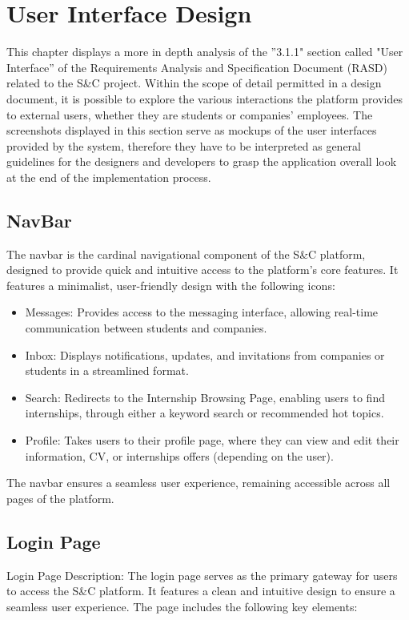 \chapter{User Interface Design}
This chapter displays a more in depth analysis of the ”3.1.1" section called "User Interface” of the
 Requirements Analysis and
 Specification Document (RASD) related to the S\&C project. 
 Within the scope of detail permitted in a design document, 
 it is possible to explore the various interactions the platform provides to external users,
  whether they are students or companies' employees.
 The screenshots displayed in this section serve as mockups of the user interfaces provided by the system, 
 therefore they have to be interpreted as general guidelines for the designers and developers to
 grasp the application overall look at the end of the implementation process.



\section{NavBar}
The navbar is the cardinal navigational component of the S\&C platform, 
designed to provide quick and intuitive access to the platform's core features. 
It features a minimalist, user-friendly design with the following icons:  

\begin{itemize}
    \item Messages: Provides access to the messaging interface, 
    allowing real-time communication between students and companies.  
    \item Inbox: Displays notifications, updates, 
    and invitations from companies or students in a streamlined format.  
    \item Search: Redirects to the Internship Browsing Page,
    enabling users to find internships, through either a keyword search or recommended hot topics.
    \item Profile: Takes users to their profile page, 
    where they can view and edit their information, CV, or internships offers (depending on the user).  
\end{itemize}
The navbar ensures a seamless user experience, remaining accessible across all pages of the platform.

\section{Login Page}
Login Page Description:
The login page serves as the primary gateway for users to access the S&C platform. 
It features a clean and intuitive design to ensure a seamless user experience. 
The page includes the following key elements:

